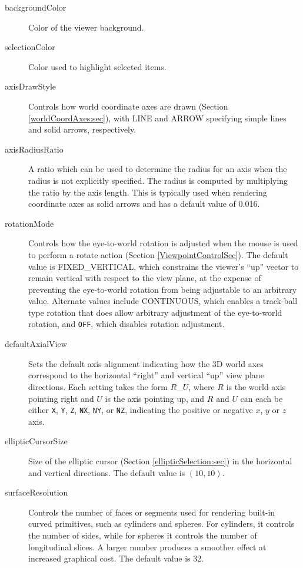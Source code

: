 \documentclass{article}
\begin{document}
\begin{description}

\item[backgroundColor]\mbox{}

Color of the viewer background.

\item[selectionColor]\mbox{}

Color used to highlight selected items.

\item[axisDrawStyle]\mbox{}

Controls how world coordinate axes are drawn (Section
\ref{worldCoordAxes:sec}), with {\sf LINE} and {\sf ARROW} specifying
simple lines and solid arrows, respectively.

\item[axisRadiusRatio]\mbox{}

A ratio which can be used to determine the radius for an axis when the
radius is not explicitly specified. The radius is computed by
multiplying the ratio by the axis length. This is typically used when
rendering coordinate axes as solid arrows and has a default value of
0.016.

\item[rotationMode]\mbox{}

Controls how the eye-to-world rotation is adjusted when the mouse is
used to perform a rotate action (Section \ref{ViewpointControlSec}).
The default value is {\sf FIXED\_VERTICAL}, which constrains the
viewer's ``up'' vector to remain vertical with respect to the view
plane, at the expense of preventing the eye-to-world rotation from
being adjustable to an arbitrary value. Alternate values include {\sf
CONTINUOUS}, which enables a track-ball type rotation that does allow
arbitrary adjustment of the eye-to-world rotation, and {\tt OFF},
which disables rotation adjustment.

\item[defaultAxialView]\mbox{}

Sets the default axis alignment indicating how the 3D world axes
correspond to the horizontal ``right'' and vertical ``up'' view plane
directions.  Each setting takes the form $R$\_$U$, where $R$ is the
world axis pointing right and $U$ is the axis pointing up, and $R$ and
$U$ can each be either {\tt X}, {\tt Y}, {\tt Z}, {\tt NX}, {\tt NY},
or {\tt NZ}, indicating the positive or negative $x$, $y$ or $z$ axis.

\item[ellipticCursorSize]\mbox{}

Size of the elliptic cursor (Section \ref{ellipticSelection:sec}) in
the horizontal and vertical directions. The default value is
$(10, 10)$.

\item[surfaceResolution]\mbox{}

Controls the number of faces or segments used for
rendering built-in curved primitives, such as cylinders and
spheres. For cylinders, it controls the number of sides, while for
spheres it controls the number of longitudinal slices. A larger number
produces a smoother effect at increased graphical cost. The default
value is 32.

\end{description}
\end{document}
